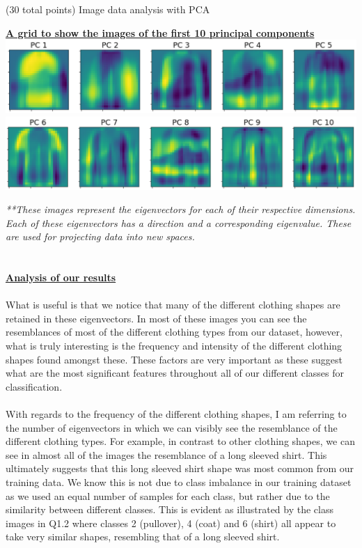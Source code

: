 \documentclass[12pt]{article}
\begin{document}
\begin{question}{(30 total points) Image data analysis with PCA}
\begin{subquestion}
      \begin{answerbox}{40.5em}
        \begin{center}
        \textbf{\underline{A grid to show the images of the first 10 principal components}}
        \vspace{0.3cm}\\
         \includegraphics[width=1\textwidth]{images/q151.png}
         \includegraphics[width=1\textwidth]{images/q152.png}
        \end{center}
        \scriptsize{
        \emph{**These images represent the eigenvectors for each of their respective dimensions. Each of these eigenvectors has a direction and a corresponding eigenvalue. These are used for projecting data into new spaces.}\\
\\
\\
        \textbf{\footnotesize{\underline{Analysis of our results}}}\\
\\
        What is useful is that we notice that many of the different clothing shapes are retained in these eigenvectors. In most of these images you can see the resemblances of most of the different clothing types from our dataset, however, what is truly interesting is the frequency and intensity of the different clothing shapes found amongst these. These factors are very important as these suggest what are the most significant features throughout all of our different classes for classification.\\
\\
        With regards to the frequency of the different clothing shapes, I am referring to the number of eigenvectors in which we can visibly see the resemblance of the different clothing types. For example, in contrast to other clothing shapes, we can see in almost all of the images the resemblance of a long sleeved shirt. This ultimately suggests that this long sleeved shirt shape was most common from our training data. We know this is not due to class imbalance in our training dataset as we used an equal number of samples for each class, but rather due to the similarity between different classes. This is evident as illustrated by the class images in Q1.2 where classes 2 (pullover), 4 (coat) and 6 (shirt) all appear to take very similar shapes, resembling that of a long sleeved shirt.\\
}
\end{answerbox}
\end{subquestion}
\end{question}
\end{document}
